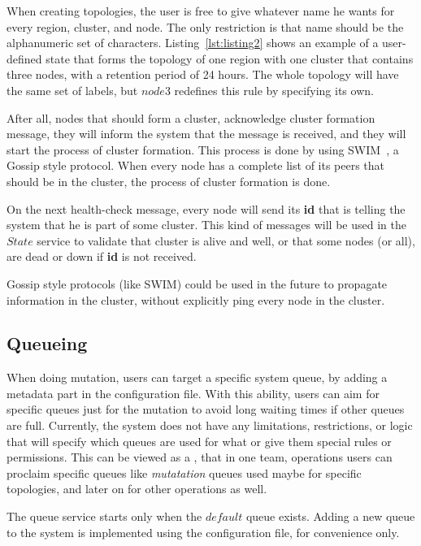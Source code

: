 When creating topologies, the user is free to give whatever name he wants for every region, cluster, and node. The only restriction is that name should be the alphanumeric set of characters. Listing~\ref{lst:listing2} shows an example of a user-defined state that forms the topology of one region with one cluster that contains three nodes, with a retention period of 24 hours. The whole topology will have the same set of labels, but $node3$ redefines this rule by specifying its own.



\noindent
After all, nodes that should form a cluster, acknowledge cluster formation message, they will inform the system that the message is received, and they will start the process of cluster formation. This process is done by using SWIM~\cite{DasGM02}, a Gossip style protocol. When every node has a complete list of its peers that should be in the cluster, the process of cluster formation is done. 

On the next health-check message, every node will send its \textbf{id} that is telling the system that he is part of some cluster. This kind of messages will be used in the $State$ service to validate that cluster is alive and well, or that some nodes (or all), are dead or down if \textbf{id} is not received. 

Gossip style protocols (like SWIM) could be used in the future to propagate information in the cluster, without explicitly ping every node in the cluster.
%
%
\subsection{Queueing}\label{sec:queueing}
%
When doing mutation, users can target a specific system queue, by adding a metadata part in the configuration file. With this ability, users can aim for specific queues just for the mutation to avoid long waiting times if other queues are full. Currently, the system does not have any limitations, restrictions, or logic that will specify which queues are used for what or give them special rules or permissions. This can be viewed as a , that in one team, operations users can proclaim specific queues like \textit{mutatation} queues used maybe for specific topologies, and later on for other operations as well.

The queue service starts only when the $default$ queue exists. Adding a new queue to the system is implemented using the configuration file, for convenience only. 

